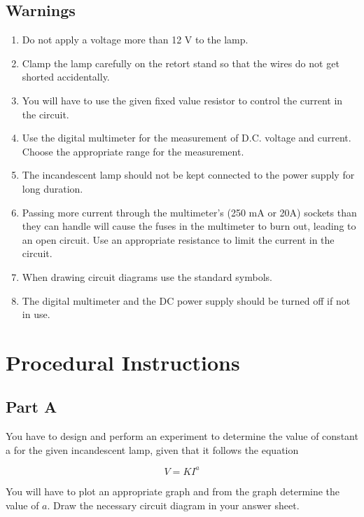 \subsection*{Warnings}

\begin{enumerate}
\item Do not apply a voltage more than 12 V to the lamp.
\item Clamp the lamp carefully on the retort stand so that the wires do not get shorted accidentally.
\item You will have to use the given fixed value resistor to control the current in the circuit.
\item Use the digital multimeter for the measurement of D.C. voltage and current.  Choose the appropriate range for the measurement.
\item The incandescent lamp should not be kept connected to the power supply for long duration. 

\item Passing more current through the multimeter's (250 mA or 20A) sockets than they can handle will cause the fuses in the multimeter to burn out, leading to an open circuit. Use an appropriate resistance to limit the current in the circuit.

\item When drawing circuit diagrams use the standard symbols.

\item The digital multimeter and the DC power supply should be turned off if not in use.

\end{enumerate}


\section*{Procedural Instructions}

\subsection*{Part A}

You have to design and perform an experiment to determine the value of constant a for the given incandescent lamp, given that it follows the equation 

\begin{equation*}
V = K I^a
\end{equation*}

You will have to plot an appropriate graph and from the graph determine the value of $a$. Draw the necessary circuit diagram in your answer sheet.

